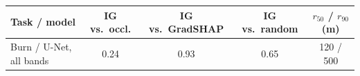 \begin{tabular}{@{}lcccc@{}}
\toprule
Task / model & IG vs.\ occl. & IG vs.\ GradSHAP & IG vs.\ random & $r_{50}$ / $r_{90}$ (m) \\
\midrule
Burn / U-Net, all bands & 0.24 & 0.93 & 0.65 & 120 / 500 \\
\bottomrule
\end{tabular}